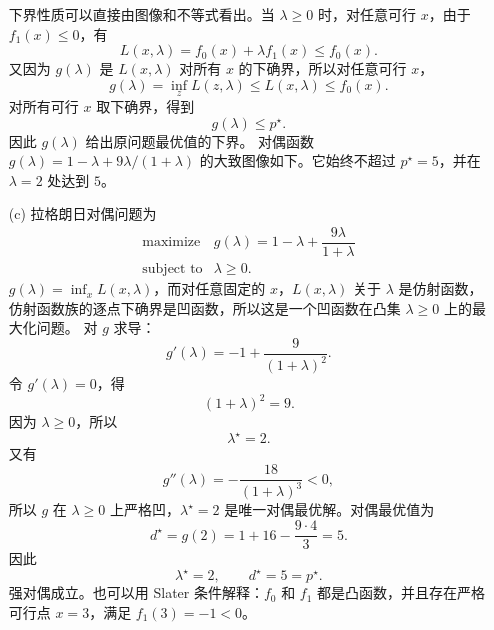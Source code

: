 \documentclass[12pt,a4paper]{article}
\begin{document}
\begin{itemize}
  下界性质可以直接由图像和不等式看出。当 $\lambda\geq0$ 时，对任意可行 $x$，由于 $f_1(x)\leq0$，有
  \[
    L(x,\lambda)=f_0(x)+\lambda f_1(x)\leq f_0(x).
  \]
  又因为 $g(\lambda)$ 是 $L(x,\lambda)$ 对所有 $x$ 的下确界，所以对任意可行 $x$，
  \[
    g(\lambda)=\inf_z L(z,\lambda)\leq L(x,\lambda)\leq f_0(x).
  \]
  对所有可行 $x$ 取下确界，得到
  \[
    g(\lambda)\leq p^\star.
  \]
  因此 $g(\lambda)$ 给出原问题最优值的下界。
  对偶函数 $g(\lambda)=1-\lambda+9\lambda/(1+\lambda)$ 的大致图像如下。它始终不超过 $p^\star=5$，并在 $\lambda=2$ 处达到 $5$。



  \begin{center}
  \end{center}

  \item[(c)] 拉格朗日对偶问题为
  \[
    \begin{array}{ll}
      \text{maximize} & g(\lambda)
      =1-\lambda+\dfrac{9\lambda}{1+\lambda}\\[0.6em]
      \text{subject to} & \lambda\geq 0.
    \end{array}
  \]
 $g(\lambda)=\inf_x L(x,\lambda)$，而对任意固定的 $x$，$L(x,\lambda)$ 关于 $\lambda$ 是仿射函数，仿射函数族的逐点下确界是凹函数，所以这是一个凹函数在凸集 $\lambda\geq0$ 上的最大化问题。
  对 $g$ 求导：
  \[
    g'(\lambda)=-1+\frac{9}{(1+\lambda)^2}.
  \]
  令 $g'(\lambda)=0$，得
  \[
    (1+\lambda)^2=9.
  \]
  因为 $\lambda\geq0$，所以
  \[
    \lambda^\star=2.
  \]
  又有
  \[
    g''(\lambda)=-\frac{18}{(1+\lambda)^3}<0,
  \]
  所以 $g$ 在 $\lambda\geq0$ 上严格凹，$\lambda^\star=2$ 是唯一对偶最优解。对偶最优值为
  \[
    d^\star=g(2)=1+16-\frac{9\cdot4}{3}=5.
  \]
  因此
  \[
    \boxed{\lambda^\star=2,\qquad d^\star=5=p^\star.}
  \]
  强对偶成立。也可以用 Slater 条件解释：$f_0$ 和 $f_1$ 都是凸函数，并且存在严格可行点 $x=3$，满足 $f_1(3)=-1<0$。


\end{itemize}
\end{document}
